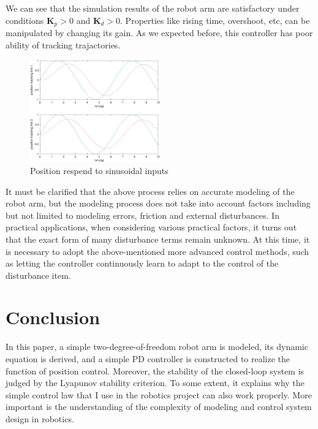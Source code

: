 \documentclass[a4paper]{article}
\begin{document}


We can see that the simulation results of the robot arm are satisfactory under conditions $\boldsymbol{K}_p>0$ and $\boldsymbol{K}_d>0$. Properties like rising time, overshoot, etc, can be manipulated by changing its gain. As we expected before, this controller has poor ability of tracking trajactories. 

\begin{figure}[H]
\centering
\includegraphics[width = 0.5\textwidth]{pic/sin.png}
\caption{Position respend to sinusoidal inputs}
\end{figure}

It must be clarified that the above process relies on accurate modeling of the robot arm, but the modeling process does not take into account factors including but not limited to modeling errors, friction and external disturbances. In practical applications, when considering various practical factors, it turns out that the exact form of many disturbance terms remain unknown. At this time, it is necessary to adopt the above-mentioned more advanced control methods, such as letting the controller continuously learn to adapt to the control of the disturbance item. 

\section{Conclusion}
In this paper, a simple two-degree-of-freedom robot arm is modeled, its dynamic equation is derived, and a simple PD controller is constructed to realize the function of position control. Moreover, the stability of the closed-loop system is judged by the Lyapunov stability criterion. To some extent, it explains why the simple control law that I use in the robotics project can also work properly. More important is the understanding of the complexity of modeling and control system design in robotics. 





\end{document}
